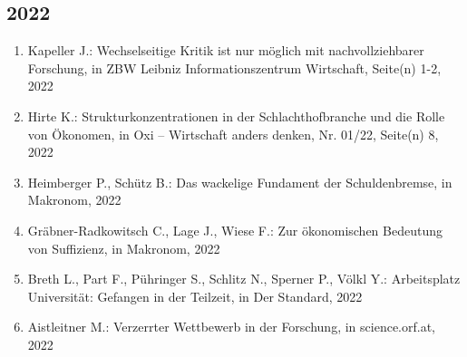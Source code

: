 \subsection*{2022}
\begin{enumerate}
    	 \item Kapeller J.: Wechselseitige Kritik ist nur möglich mit nachvollziehbarer Forschung, in ZBW Leibniz Informationszentrum Wirtschaft, Seite(n) 1-2, 2022
	 \item Hirte K.: Strukturkonzentrationen in der Schlachthofbranche und die Rolle von Ökonomen, in Oxi -- Wirtschaft anders denken, Nr. 01/22, Seite(n) 8, 2022
	 \item Heimberger P., Schütz B.: Das wackelige Fundament der Schuldenbremse, in Makronom, 2022
	 \item Gräbner-Radkowitsch C., Lage J., Wiese F.: Zur ökonomischen Bedeutung von Suffizienz, in Makronom, 2022
	 \item Breth L., Part F., Pühringer S., Schlitz N., Sperner P., Völkl Y.: Arbeitsplatz Universität: Gefangen in der Teilzeit, in Der Standard, 2022
	 \item Aistleitner M.: Verzerrter Wettbewerb in der Forschung, in science.orf.at, 2022
\end{enumerate}

